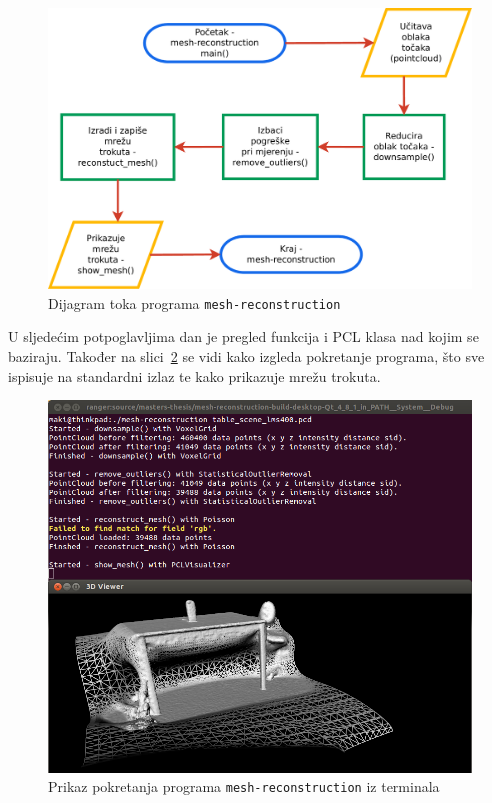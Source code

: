 \begin{figure}[h]
\renewcommand{\figurename}{Grafikon}
\centering
\includegraphics[scale=0.5]{figures/flowchart.pdf}
\caption{Dijagram toka programa \texttt{mesh-reconstruction} }
\label{fig:flowchart}
\end{figure}

U sljedećim potpoglavljima dan je pregled funkcija i PCL klasa nad kojim
se baziraju. Također na slici~\ref{fig:running-mesh-reconstruction} se
vidi kako izgleda pokretanje programa, što sve ispisuje na standardni
izlaz te kako prikazuje mrežu trokuta.

\newpage
\setcounter{figure}{0}
\begin{figure}[h]
\centering
\includegraphics[scale=0.5]{figures/running-mesh-reconstruction.png}
\caption{Prikaz pokretanja programa \texttt{mesh-reconstruction} iz
terminala}
\label{fig:running-mesh-reconstruction}
\end{figure}


